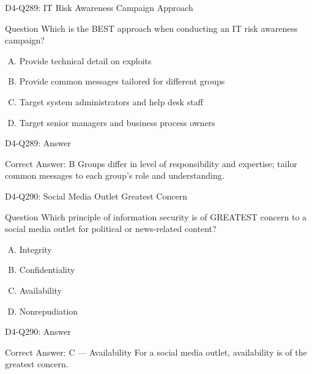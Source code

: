 \documentclass{beamer}
\begin{document}
	\begin{frame}{D4-Q289: IT Risk Awareness Campaign Approach}
		\begin{block}{Question}
			Which is the BEST approach when conducting an IT risk awareness campaign?
		\end{block}
		\begin{enumerate}[(A)]
			\item Provide technical detail on exploits
			\item Provide common messages tailored for different groups
			\item Target system administrators and help desk staff
			\item Target senior managers and business process owners
		\end{enumerate}
	\end{frame}
	\begin{frame}{D4-Q289: Answer}
		\begin{block}{Correct Answer: B}
			Groups differ in level of responsibility and expertise; tailor common messages to each group's role and understanding.
		\end{block}
	\end{frame}
	
	\begin{frame}{D4-Q290: Social Media Outlet Greatest Concern}
		\begin{block}{Question}
			Which principle of information security is of GREATEST concern to a social media outlet for political or news-related content?
		\end{block}
		\begin{enumerate}[(A)]
			\item Integrity
			\item Confidentiality
			\item Availability
			\item Nonrepudiation
		\end{enumerate}
	\end{frame}
	\begin{frame}{D4-Q290: Answer}
		\begin{block}{Correct Answer: C --- Availability}
			For a social media outlet, availability is of the greatest concern.
		\end{block}
	\end{frame}
	
\end{document}
